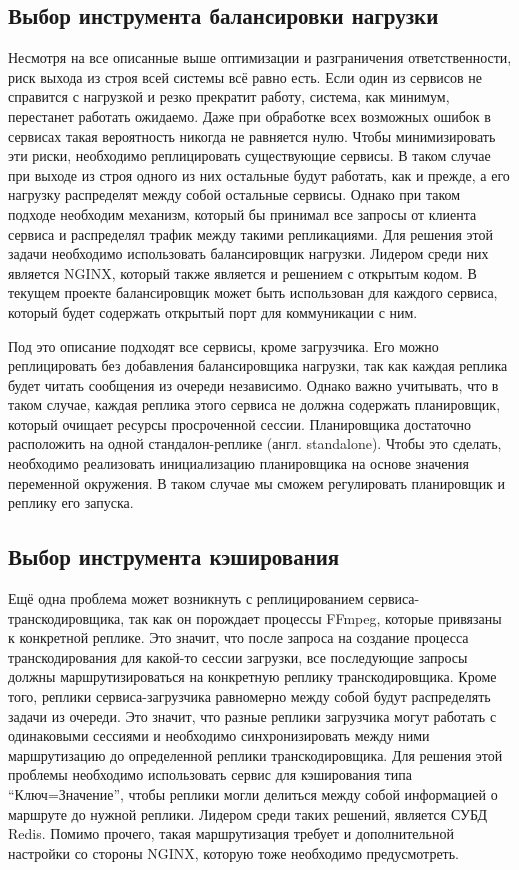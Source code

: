 	\subsection{Выбор инструмента балансировки нагрузки}

	Несмотря на все описанные выше оптимизации и разграничения ответственности, риск выхода из строя всей системы всё равно есть. Если один из сервисов не справится с нагрузкой и резко прекратит работу, система, как минимум, перестанет работать ожидаемо. Даже при обработке всех возможных ошибок в сервисах такая вероятность никогда не равняется нулю. Чтобы минимизировать эти риски, необходимо реплицировать существующие сервисы. В таком случае при выходе из строя одного из них остальные будут работать, как и прежде, а его нагрузку распределят между собой остальные сервисы. Однако при таком подходе необходим механизм, который бы принимал все запросы от клиента сервиса и распределял трафик между такими репликациями. Для решения этой задачи необходимо использовать балансировщик нагрузки. Лидером среди них является NGINX, который также является и решением с открытым кодом. В текущем проекте балансировщик может быть использован для каждого сервиса, который будет содержать открытый порт для коммуникации с ним.
	
	Под это описание подходят все сервисы, кроме загрузчика. Его можно реплицировать без добавления балансировщика нагрузки, так как каждая реплика будет читать сообщения из очереди независимо. Однако важно учитывать, что в таком случае, каждая реплика этого сервиса не должна содержать планировщик, который очищает ресурсы просроченной сессии. Планировщика достаточно расположить на одной стандалон-реплике (англ. standalone). Чтобы это сделать, необходимо реализовать инициализацию планировщика на основе значения переменной окружения. В таком случае мы сможем регулировать планировщик и реплику его запуска.

	\subsection{Выбор инструмента кэширования}

	Ещё одна проблема может возникнуть с реплицированием сервиса-транскодировщика, так как он порождает процессы FFmpeg, которые привязаны к конкретной реплике. Это значит, что после запроса на создание процесса транскодирования для какой-то сессии загрузки, все последующие запросы должны маршрутизироваться на конкретную реплику транскодировщика. Кроме того, реплики сервиса-загрузчика равномерно между собой будут распределять задачи из очереди. Это значит, что разные реплики загрузчика могут работать с одинаковыми сессиями и необходимо синхронизировать между ними маршрутизацию до определенной реплики транскодировщика. Для решения этой проблемы необходимо использовать сервис для кэширования типа “Ключ=Значение”, чтобы реплики могли делиться между собой информацией о маршруте до нужной реплики. Лидером среди таких решений, является СУБД Redis. Помимо прочего, такая маршрутизация требует и дополнительной настройки со стороны NGINX, которую тоже необходимо предусмотреть.
	
